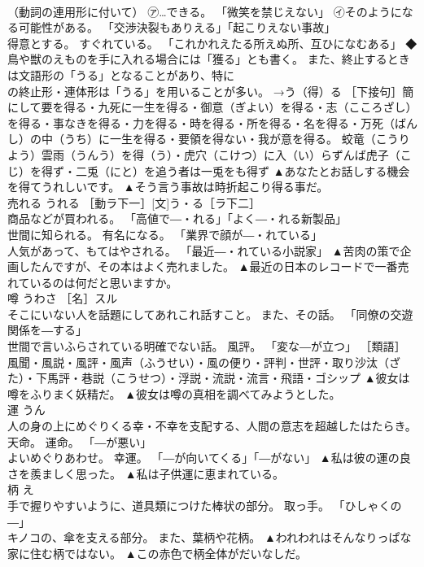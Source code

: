 \documentclass[8pt]{extreport}
\begin{document}
\begin{CJK}{UTF8}{min}
\\	（動詞の連用形に付いて） ㋐…できる。 「微笑を禁じえない」 ㋑そのようになる可能性がある。 「交渉決裂もありえる」「起こりえない事故」 
\\	得意とする。 すぐれている。 「これかれえたる所えぬ所、互ひになむある」 ◆鳥や獣のえものを手に入れる場合には「獲る」とも書く。 また、終止するときは文語形の「うる」となることがあり、特に 
\\	の終止形・連体形は「うる」を用いることが多い。 →う（得）る ［下接句］簡にして要を得る・九死に一生を得る・御意（ぎよい）を得る・志（こころざし）を得る・事なきを得る・力を得る・時を得る・所を得る・名を得る・万死（ばんし）の中（うち）に一生を得る・要領を得ない・我が意を得る。 蛟竜（こうりよう）雲雨（うんう）を得（う）・虎穴（こけつ）に入（い）らずんば虎子（こじ）を得ず・二兎（にと）を追う者は一兎をも得ず	▲あなたとお話しする機会を得てうれしいです。 ▲そう言う事故は時折起こり得る事だ。
\\	売れる	うれる	［動ラ下一］[文]う・る［ラ下二］ 
\\	商品などが買われる。 「高値で―・れる」「よく―・れる新製品」 
\\	世間に知られる。 有名になる。 「業界で顔が―・れている」 
\\	人気があって、もてはやされる。 「最近―・れている小説家」	▲苦肉の策で企画したんですが、その本はよく売れました。 ▲最近の日本のレコードで一番売れているのは何だと思いますか。
\\	噂	うわさ	［名］スル 
\\	そこにいない人を話題にしてあれこれ話すこと。 また、その話。 「同僚の交遊関係を―する」 
\\	世間で言いふらされている明確でない話。 風評。 「変な―が立つ」 ［類語］
\\	風聞・風説・風評・風声（ふうせい）・風の便り・評判・世評・取り沙汰（ざた）・下馬評・巷説（こうせつ）・浮説・流説・流言・飛語・ゴシップ	▲彼女は噂をふりまく妖精だ。 ▲彼女は噂の真相を調べてみようとした。
\\	運	うん	
\\	人の身の上にめぐりくる幸・不幸を支配する、人間の意志を超越したはたらき。 天命。 運命。 「―が悪い」 
\\	よいめぐりあわせ。 幸運。 「―が向いてくる」「―がない」	▲私は彼の運の良さを羨ましく思った。 ▲私は子供運に恵まれている。
\\	柄	え	
\\	手で握りやすいように、道具類につけた棒状の部分。 取っ手。 「ひしゃくの―」 
\\	キノコの、傘を支える部分。 また、葉柄や花柄。	▲われわれはそんなりっぱな家に住む柄ではない。 ▲この赤色で柄全体がだいなしだ。

\end{CJK}
\end{document}
